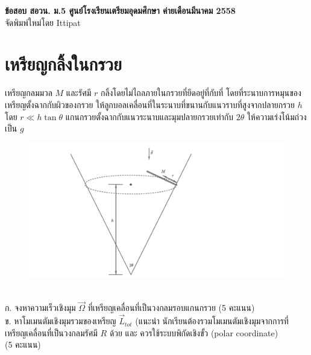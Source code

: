 \documentclass[a4paper,12pt]{article}
\begin{document}
		\begin{center}
			\large\textbf{ข้อสอบ สอวน. ม.5 ศูนย์โรงเรียนเตรียมอุดมศึกษา ค่ายเดือนมีนาคม 2558}\\
			\normalsize จัดพิมพ์ใหม่โดย Ittipat
		\end{center}

\section{เหรียญกลิ้งในกรวย}
เหรียญกลมมวล $M$ และรัศมี $r$ กลิ้งโดยไม่ไถลภายในกรวยที่ยึดอยู่ที่กับที่ โดยที่ระนาบการหมุนของเหรียญตั้งฉากกับผิวของกรวย ให้ลูกบอลเคลื่อนที่ในระนาบที่ขนานกับแนวราบที่สูงจากปลายกรวย $h$ โดย $r\ll h\tan\theta$ แกนกรวยตั้งฉากกับแนวระนาบและมุมปลายกรวยเท่ากับ $2\theta$ ให้ความเร่งโน้มถ่วงเป็น $g$
	\begin{figure}[h]
	\centering
	\includegraphics[scale=0.4]{1}
	\label{fig:1}
	\end{figure}
\\ก. จงหาความเร็วเชิงมุม $\vec{\Omega}$ ที่เหรียญเคลื่อนที่เป็นวงกลมรอบแกนกรวย \hfill(5 คะแนน)\\
ข. หาโมเมนตัมเชิงมุมรวมของเหรียญ $\vec{L}_{tot}$ (แนะนำ นักเรียนต้องรวมโมเมนตัมเชิงมุมจากการที่เหรียญเคลื่อนที่เป็นวงกลมรัศมี $R$ ด้วย และ ควรใช้ระบบพิกัดเชิงขั้ว (polar coordinate)\\(5 คะแนน)
\end{document}

